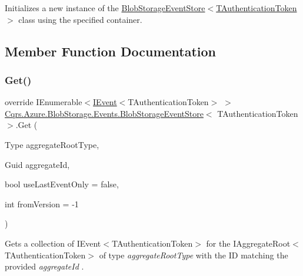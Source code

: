 Initializes a new instance of the \hyperlink{classCqrs_1_1Azure_1_1BlobStorage_1_1Events_1_1BlobStorageEventStore_a04ce4516e7e1d30339d3f04ba54abe54_a04ce4516e7e1d30339d3f04ba54abe54}{Blob\+Storage\+Event\+Store$<$\+T\+Authentication\+Token$>$} class using the specified container. 



\subsection{Member Function Documentation}
\mbox{\label{classCqrs_1_1Azure_1_1BlobStorage_1_1Events_1_1BlobStorageEventStore_ab68b594c54ae5a79e3b8d5db1902752d_ab68b594c54ae5a79e3b8d5db1902752d}} 
\subsubsection{\texorpdfstring{Get()}{Get()}\hspace{0.1cm}{\footnotesize\ttfamily [1/2]}}
{\footnotesize\ttfamily override I\+Enumerable$<$\hyperlink{interfaceCqrs_1_1Events_1_1IEvent}{I\+Event}$<$T\+Authentication\+Token$>$ $>$ \hyperlink{classCqrs_1_1Azure_1_1BlobStorage_1_1Events_1_1BlobStorageEventStore}{Cqrs.\+Azure.\+Blob\+Storage.\+Events.\+Blob\+Storage\+Event\+Store}$<$ T\+Authentication\+Token $>$.Get (\begin{DoxyParamCaption}\item[{Type}]{aggregate\+Root\+Type,  }\item[{Guid}]{aggregate\+Id,  }\item[{bool}]{use\+Last\+Event\+Only = {\ttfamily false},  }\item[{int}]{from\+Version = {\ttfamily -\/1} }\end{DoxyParamCaption})\hspace{0.3cm}{\ttfamily [virtual]}}



Gets a collection of I\+Event$<$\+T\+Authentication\+Token$>$ for the I\+Aggregate\+Root$<$\+T\+Authentication\+Token$>$ of type {\itshape aggregate\+Root\+Type}  with the ID matching the provided {\itshape aggregate\+Id} . 


